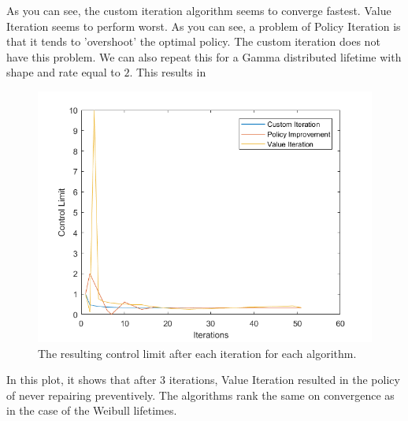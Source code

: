 As you can see, the custom iteration algorithm seems to converge fastest.
Value Iteration seems to perform worst.
As you can see, a problem of Policy Iteration is that it tends to 'overshoot' the optimal policy.
The custom iteration does not have this problem.
We can also repeat this for a Gamma distributed lifetime with shape and rate equal to $2$.
This results in  
\begin{figure}[H]
\centering
\includegraphics[width=\textwidth]{Plots/CL Gamma2-2 Discount-1 Start-1.png}
\caption{The resulting control limit after each iteration for each algorithm.}
\end{figure}
In this plot, it shows that after 3 iterations, Value Iteration resulted in the policy of never repairing preventively.
The algorithms rank the same on convergence as in the case of the Weibull lifetimes.

